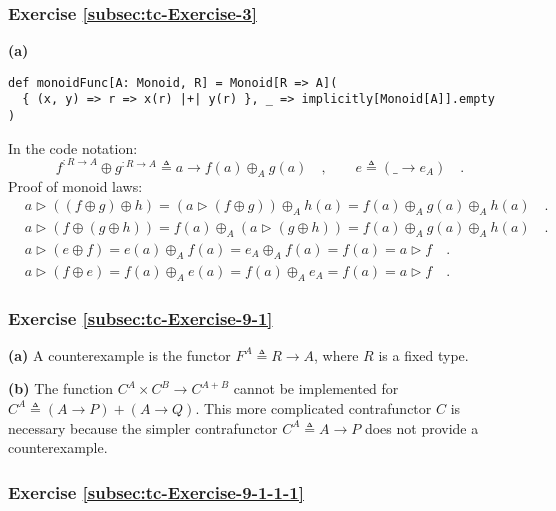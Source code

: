 
\subsubsection*{Exercise \ref{subsec:tc-Exercise-3}}

\textbf{(a)}
\begin{lstlisting}
def monoidFunc[A: Monoid, R] = Monoid[R => A](
  { (x, y) => r => x(r) |+| y(r) }, _ => implicitly[Monoid[A]].empty
)
\end{lstlisting}

In the code notation:
\[
f^{:R\rightarrow A}\oplus g^{:R\rightarrow A}\triangleq a\rightarrow f(a)\oplus_{A}g(a)\quad,\quad\quad e\triangleq(\_\rightarrow e_{A})\quad.
\]
Proof of monoid laws:
\begin{align*}
 & a\triangleright\left(\left(f\oplus g\right)\oplus h\right)=\left(a\triangleright(f\oplus g)\right)\oplus_{A}h(a)=f(a)\oplus_{A}g(a)\oplus_{A}h(a)\quad.\\
 & a\triangleright\left(f\oplus\left(g\oplus h\right)\right)=f(a)\oplus_{A}\left(a\triangleright(g\oplus h)\right)=f(a)\oplus_{A}g(a)\oplus_{A}h(a)\quad.\\
 & a\triangleright\left(e\oplus f\right)=e(a)\oplus_{A}f(a)=e_{A}\oplus_{A}f(a)=f(a)=a\triangleright f\quad.\\
 & a\triangleright(f\oplus e)=f(a)\oplus_{A}e(a)=f(a)\oplus_{A}e_{A}=f(a)=a\triangleright f\quad.
\end{align*}


\subsubsection*{Exercise \ref{subsec:tc-Exercise-9-1} }

\textbf{(a)} A counterexample is the functor $F^{A}\triangleq R\rightarrow A$,
where $R$ is a fixed type.

\textbf{(b)} The function $C^{A}\times C^{B}\rightarrow C^{A+B}$
cannot be implemented for $C^{A}\triangleq\left(A\rightarrow P\right)+\left(A\rightarrow Q\right)$.
This more complicated contrafunctor $C$ is necessary because the
simpler contrafunctor $C^{A}\triangleq A\rightarrow P$ does not provide
a counterexample.

\subsubsection*{Exercise \ref{subsec:tc-Exercise-9-1-1-1}}


